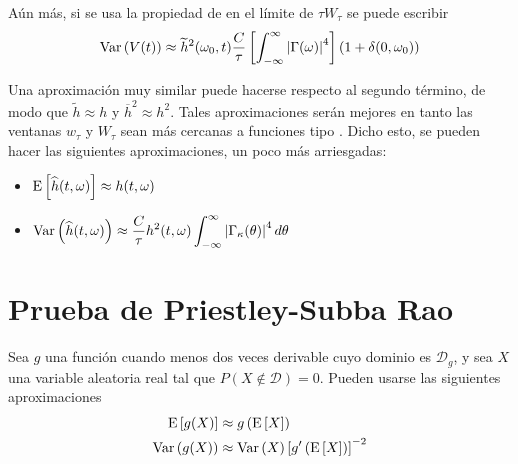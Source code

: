 Aún más, si se usa la propiedad de en el límite de $\tau W_\tau$ se puede escribir
\begin{equation}
\mathrm{Var}\left( V(t) \right) \approx 
\widetilde{h}^{2}(\omega_0,t) \frac{C}{\tau} \left[ \int_{-\infty}^{\infty} \left| \Gamma(\omega) \right|^{4} \right] (1+\delta(0,\omega_0))
\end{equation}

Una aproximación muy similar 
puede hacerse respecto al segundo término, de modo que $\widetilde{h}\approx h$ y 
$\overline{h}^{2}\approx h^{2}$.
Tales aproximaciones serán mejores en tanto las ventanas $w_{\tau}$ y $W_{\tau}$ sean más 
cercanas a funciones tipo \dirac.
Dicho esto, se pueden hacer las siguientes aproximaciones, un poco más arriesgadas:
\begin{itemize}
\item $\displaystyle \mathrm{E}\left[ \widehat{ h }(t,\omega) \right] \approx h(t,\omega)$
\item $\displaystyle \mathrm{Var}\left( \widehat{ h }(t,\omega) \right) \approx 
\frac{C}{\tau} h^{2}(t,\omega) \int_{-\infty}^{\infty} \left| \Gamma_\kappa (\theta) \right|^{4} d\theta$
\end{itemize}


\section{Prueba de Priestley-Subba Rao}
\label{sec:psr}

\begin{proposicion}
Sea $g$ una función cuando menos dos veces derivable cuyo dominio es $\mathcal{D}_g$, y sea $X$ una variable aleatoria real tal que $P(X\notin \mathcal{D}) = 0$. 
%
Pueden usarse las siguientes aproximaciones
\begin{align}
\mathrm{E}\left[ g(X) \right] &\approx g\left( \mathrm{E}\left[ X \right] \right) \\
\mathrm{Var}\left( g(X) \right) &\approx \mathrm{Var}\left( X \right) \left[ g^{\prime} \left( \mathrm{E}\left[ X \right] \right) \right]^{-2}
\end{align}
\end{proposicion}

